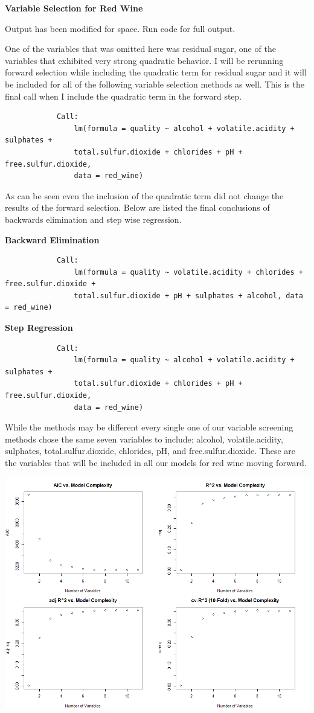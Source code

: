 \documentclass{article}
\begin{document}
	\textbf{Variable Selection for Red Wine} 
	
	
		Output has been modified for space. Run code for full output. 
	

	One of the variables that was omitted here was residual sugar, one of the variables that exhibited very strong 
	quadratic behavior. I will be rerunning forward selection while including the quadratic term for residual sugar 
	and it will be included for all of the following variable selection methods as well. This is the final call when 
	I include the quadratic term in the forward step. 
	
	\begin{verbatim}
			Call:
				lm(formula = quality ~ alcohol + volatile.acidity + sulphates + 
				total.sulfur.dioxide + chlorides + pH + free.sulfur.dioxide, 
				data = red_wine)
	\end{verbatim}
	
	As can be seen even the inclusion of the quadratic term did not change the results of the forward selection. Below
	are listed the final conclusions of backwards elimination and step wise regression. 
	
	\textbf{Backward Elimination}
	\begin{verbatim}
			Call:
				lm(formula = quality ~ volatile.acidity + chlorides + free.sulfur.dioxide + 
				total.sulfur.dioxide + pH + sulphates + alcohol, data = red_wine)
	\end{verbatim}
	
	\textbf{Step Regression} 
	\begin{verbatim}
			Call:
				lm(formula = quality ~ alcohol + volatile.acidity + sulphates + 
				total.sulfur.dioxide + chlorides + pH + free.sulfur.dioxide, 
				data = red_wine)
	\end{verbatim}
	
	
	While the methods may be different every single one of our variable screening methods chose the same seven variables 
	to include: alcohol, volatile.acidity, sulphates, total.sulfur.dioxide, chlorides, pH, and free.sulfur.dioxide. These 
	are the variables that will be included in all our models for red wine moving forward. 
	
	\includegraphics[scale=.55]{../plots/Wine/qof_plotR.png}
	
\end{document}
